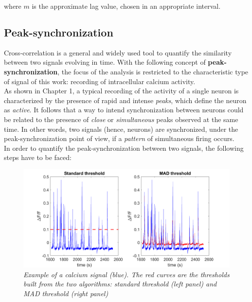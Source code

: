 \documentclass[a4paper]{article}
\begin{document}
where $m$ is the approximate lag value, chosen in an appropriate interval.



\subsection{Peak-synchronization}

Cross-correlation is a general and widely used tool to quantify the similarity between two signals evolving in time. With the following concept of \textbf{peak-synchronization}, the focus of the analysis is restricted to the characteristic type of signal of this work: recording of intracellular calcium activity.\\
As shown in Chapter 1, a typical recording of the activity of a single neuron is characterized by the presence of rapid and intense \textit{peaks}, which define the neuron as \textit{active}. It follows that a way to intend synchronization between neurons could be related to the presence of \textit{close} or \textit{simultaneous} peaks observed at the same time. In other words, two signals (hence, neurons) are synchronized, under the peak-synchronization point of view, if a \textit{pattern} of simultaneous firing occurs. 
\\

In order to quantify the peak-synchronization between two signals, the following steps have to be faced:

\begin{figure}[H]
	\begin{center}
		\hspace*{-3cm}
		\includegraphics[scale=.50]{thresholds.png} 
	\end{center} 
	\caption{\textit{Example of a calcium signal (blue). The red curves are the thresholds built from the two algorithms: standard threshold (left panel) and MAD threshold (right panel)}}
	
\end{figure}
\end{document}
